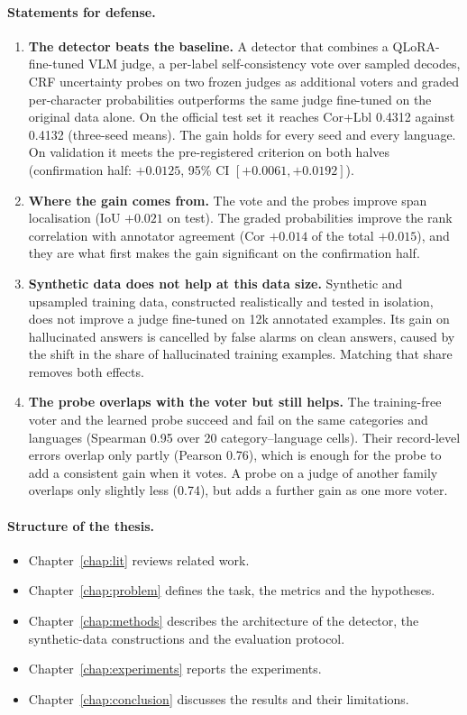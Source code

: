 \paragraph{Statements for defense.}
\begin{enumerate}
    \item \textbf{The detector beats the baseline.} A detector that combines a QLoRA-fine-tuned VLM judge, a per-label self-consistency vote over sampled decodes, CRF uncertainty probes on two frozen judges as additional voters and graded per-character probabilities outperforms the same judge fine-tuned on the original data alone. On the official test set it reaches Cor+Lbl 0.4312 against 0.4132 (three-seed means). The gain holds for every seed and every language. On validation it meets the pre-registered criterion on both halves (confirmation half: $+0.0125$, 95\% CI $[+0.0061, +0.0192]$).
    \item \textbf{Where the gain comes from.} The vote and the probes improve span localisation (IoU $+0.021$ on test). The graded probabilities improve the rank correlation with annotator agreement (Cor $+0.014$ of the total $+0.015$), and they are what first makes the gain significant on the confirmation half.
    \item \textbf{Synthetic data does not help at this data size.} Synthetic and upsampled training data, constructed realistically and tested in isolation, does not improve a judge fine-tuned on 12k annotated examples. Its gain on hallucinated answers is cancelled by false alarms on clean answers, caused by the shift in the share of hallucinated training examples. Matching that share removes both effects.
    \item \textbf{The probe overlaps with the voter but still helps.} The training-free voter and the learned probe succeed and fail on the same categories and languages (Spearman 0.95 over 20 category--language cells). Their record-level errors overlap only partly (Pearson 0.76), which is enough for the probe to add a consistent gain when it votes. A probe on a judge of another family overlaps only slightly less (0.74), but adds a further gain as one more voter.
\end{enumerate}

\paragraph{Structure of the thesis.}
\begin{itemize}
    \item Chapter~\ref{chap:lit} reviews related work.
    \item Chapter~\ref{chap:problem} defines the task, the metrics and the hypotheses.
    \item Chapter~\ref{chap:methods} describes the architecture of the detector, the synthetic-data constructions and the evaluation protocol.
    \item Chapter~\ref{chap:experiments} reports the experiments.
    \item Chapter~\ref{chap:conclusion} discusses the results and their limitations.
\end{itemize}

